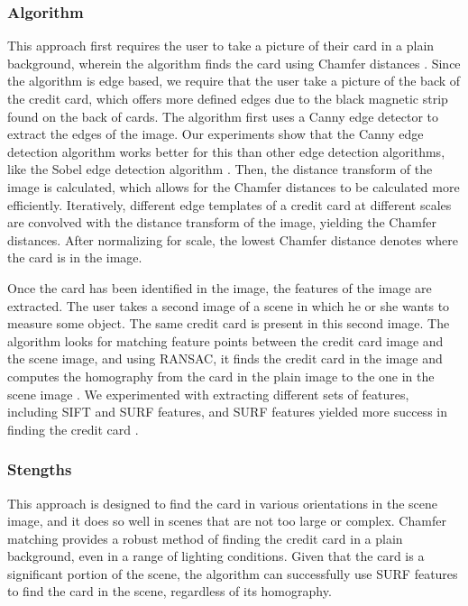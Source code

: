 \documentclass[10pt,twocolumn,letterpaper]{article}
\begin{document}
\subsubsection{Algorithm}
This approach first requires the user to take a picture of their card in a plain background, wherein the algorithm finds the card using Chamfer distances \cite{chamfer}. Since the algorithm is edge based, we require that the user take a picture of the back of the credit card, which offers more defined edges due to the black magnetic strip found on the back of cards. The algorithm first uses a Canny edge detector to extract the edges of the image. Our experiments show that the Canny edge detection algorithm works better for this than other edge detection algorithms, like the Sobel edge detection algorithm \cite{canny}. Then, the distance transform of the image is calculated, which allows for the Chamfer distances to be calculated more efficiently. Iteratively, different edge templates of a credit card at different scales are convolved with the distance transform of the image, yielding the Chamfer distances. After normalizing for scale, the lowest Chamfer distance denotes where the card is in the image.

Once the card has been identified in the image, the features of the image are extracted. The user takes a second image of a scene in which he or she wants to measure some object. The same credit card is present in this second image. The algorithm looks for matching feature points between the credit card image and the scene image, and using RANSAC, it finds the credit card in the image and computes the homography from the card in the plain image to the one in the scene image \cite{ransac}. We experimented with extracting different sets of features, including SIFT and SURF features, and SURF features yielded more success in finding the credit card \cite{sift} \cite{surf}. 

\subsubsection{Stengths}
	This approach is designed to find the card in various orientations in the scene image, and it does so well in scenes that are not too large or complex. Chamfer matching provides a robust method of finding the credit card in a plain background, even in a range of lighting conditions. Given that the card is a significant portion of the scene, the algorithm can successfully use SURF features to find the card in the scene, regardless of its homography. 
	
\end{document}
